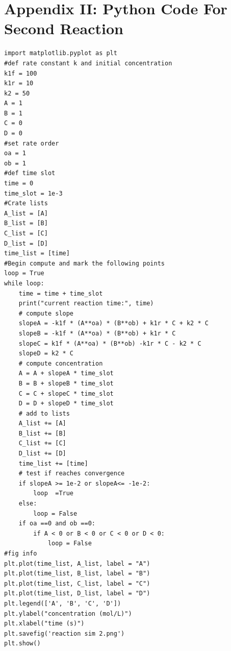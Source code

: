 \documentclass{article}
\begin{document}
\newpage
\section*{Appendix II: Python Code For Second Reaction}
\begin{lstlisting}
import matplotlib.pyplot as plt 
#def rate constant k and initial concentration
k1f = 100
k1r = 10
k2 = 50
A = 1
B = 1
C = 0
D = 0
#set rate order
oa = 1
ob = 1
#def time slot
time = 0
time_slot = 1e-3
#Crate lists
A_list = [A]
B_list = [B]
C_list = [C]
D_list = [D]
time_list = [time]
#Begin compute and mark the following points
loop = True
while loop:
    time = time + time_slot
    print("current reaction time:", time)
    # compute slope
    slopeA = -k1f * (A**oa) * (B**ob) + k1r * C + k2 * C
    slopeB = -k1f * (A**oa) * (B**ob) + k1r * C
    slopeC = k1f * (A**oa) * (B**ob) -k1r * C - k2 * C
    slopeD = k2 * C
    # compute concentration
    A = A + slopeA * time_slot
    B = B + slopeB * time_slot
    C = C + slopeC * time_slot
    D = D + slopeD * time_slot
    # add to lists
    A_list += [A]
    B_list += [B]
    C_list += [C]
    D_list += [D]
    time_list += [time]
    # test if reaches convergence
    if slopeA >= 1e-2 or slopeA<= -1e-2:
        loop  =True
    else:
        loop = False
    if oa ==0 and ob ==0:
        if A < 0 or B < 0 or C < 0 or D < 0:
            loop = False
#fig info
plt.plot(time_list, A_list, label = "A")
plt.plot(time_list, B_list, label = "B")
plt.plot(time_list, C_list, label = "C")
plt.plot(time_list, D_list, label = "D")
plt.legend(['A', 'B', 'C', 'D'])
plt.ylabel("concentration (mol/L)")
plt.xlabel("time (s)")
plt.savefig('reaction sim 2.png')
plt.show()
\end{lstlisting}
\end{document}
